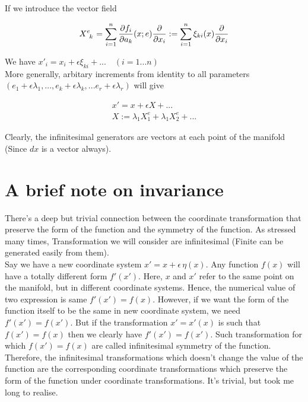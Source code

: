\documentclass{report}
\begin{document}
\noindent If we introduce the vector field

$$X\indices{^e_k} = \sum_{i=1}^{n} \frac{\partial f_i}{\partial a_k}(x;e) \frac{\partial}{\partial x_i} := \sum_{i=1}^{n}\xi_{ki}(x)\frac{\partial}{\partial x_i}$$

\noindent We have $x'_i = x_i + \epsilon \xi_{ki} + ... \quad (i=1...n)$\\

\noindent More generally, arbitary increments from identity to all parameters $(e_1 + \epsilon\lambda_1,...,e_k+\epsilon\lambda_k,...e_r+\epsilon\lambda_r)$ will give

\begin{gather}
x' = x + \epsilon X +...\\
X := \lambda_1 X_1^e + \lambda_1 X_2^e+...
\end{gather}

Clearly, the infinitesimal generators are vectors at each point of the manifold (Since $dx$ is a vector always). 

\section{A brief note on invariance}

There's a deep but trivial connection between the coordinate transformation that preserve the form of the function and the symmetry of the function. As stressed many times, Transformation we will consider are infinitesimal (Finite can be generated easily from them).\\

\noindent Say we have a new coordinate system $x' = x + \epsilon \, \eta(x)$. Any function $f(x)$ will have a totally different form $f'(x')$. Here, $x$ and $x'$ refer to the same point on the manifold, but in different coordinate systems. Hence, the numerical value of two expression is same $f'(x') = f(x)$. However, if we want the form of the function itself to be the same in new coordinate system, we need $f'(x') = f(x')$. But if the transformation $x'=x'(x)$ is such that $f(x') = f(x)$ then we clearly have $f'(x') = f(x')$. Such transformation for which $f(x') = f(x)$ are called infinitesimal symmetry of the function. Therefore, the infinitesimal transformations which doesn't change the value of the function are the corresponding coordinate transformations which preserve the form of the function under coordinate transformations. It's trivial, but took me long to realise.\\
\end{document}

